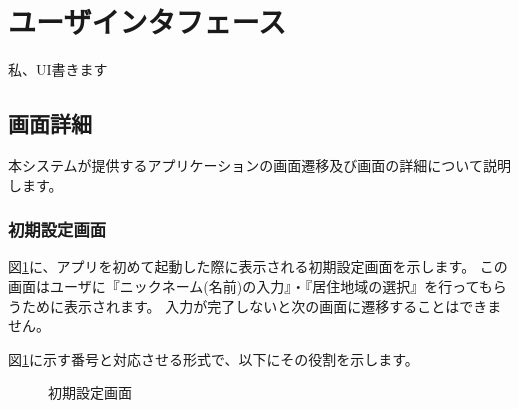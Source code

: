 \documentclass[a4j]{jarticle}
\begin{document}
\section{ユーザインタフェース}
私、UI書きます
\subsection{画面詳細}
本システムが提供するアプリケーションの画面遷移及び画面の詳細について説明します。
\subsubsection{初期設定画面}
図\ref{honjo_ui_setup}に、アプリを初めて起動した際に表示される初期設定画面を示します。
この画面はユーザに『ニックネーム(名前)の入力』・『居住地域の選択』を行ってもらうために表示されます。
入力が完了しないと次の画面に遷移することはできません。

図\ref{honjo_ui_setup}に示す番号と対応させる形式で、以下にその役割を示します。

\begin{figure}[H]
    \begin{center}
    \caption {初期設定画面}
    \label{honjo_ui_setup}
    \end{center}
\end{figure}
\end{document}
